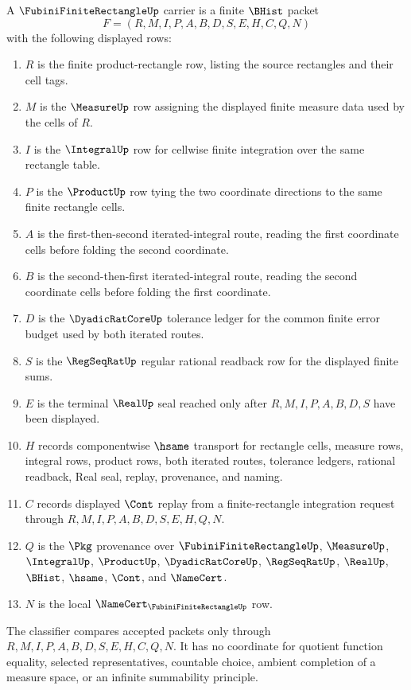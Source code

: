 \begin{definition}
\label{def:fubini-finite-rectangle-carrier}
A $\FubiniFiniteRectangleUp$ carrier is a finite $\BHist$ packet
$$
F=(R,M,I,P,A,B,D,S,E,H,C,Q,N)
$$
with the following displayed rows:
\begin{enumerate}
\item $R$ is the finite product-rectangle row, listing the source rectangles and their cell tags.
\item $M$ is the $\MeasureUp$ row assigning the displayed finite measure data used by the cells of $R$.
\item $I$ is the $\IntegralUp$ row for cellwise finite integration over the same rectangle table.
\item $P$ is the $\ProductUp$ row tying the two coordinate directions to the same finite rectangle cells.
\item $A$ is the first-then-second iterated-integral route, reading the first coordinate cells before folding the second coordinate.
\item $B$ is the second-then-first iterated-integral route, reading the second coordinate cells before folding the first coordinate.
\item $D$ is the $\DyadicRatCoreUp$ tolerance ledger for the common finite error budget used by both iterated routes.
\item $S$ is the $\RegSeqRatUp$ regular rational readback row for the displayed finite sums.
\item $E$ is the terminal $\RealUp$ seal reached only after $R,M,I,P,A,B,D,S$ have been displayed.
\item $H$ records componentwise $\hsame$ transport for rectangle cells, measure rows, integral rows, product rows, both iterated routes, tolerance ledgers, rational readback, Real seal, replay, provenance, and naming.
\item $C$ records displayed $\Cont$ replay from a finite-rectangle integration request through $R,M,I,P,A,B,D,S,E,H,Q,N$.
\item $Q$ is the $\Pkg$ provenance over $\FubiniFiniteRectangleUp$, $\MeasureUp$, $\IntegralUp$, $\ProductUp$, $\DyadicRatCoreUp$, $\RegSeqRatUp$, $\RealUp$, $\BHist$, $\hsame$, $\Cont$, and $\NameCert$.
\item $N$ is the local $\NameCert_{\FubiniFiniteRectangleUp}$ row.
\end{enumerate}
The classifier compares accepted packets only through $R,M,I,P,A,B,D,S,E,H,C,Q,N$. It has no coordinate for quotient function equality, selected representatives, countable choice, ambient completion of a measure space, or an infinite summability principle.
\end{definition}

